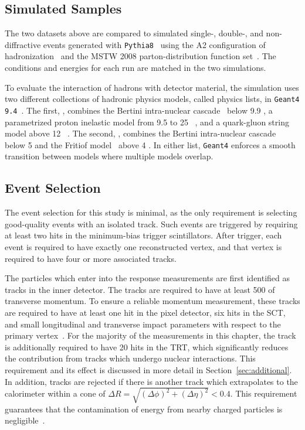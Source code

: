 \subsection{Simulated Samples}
The two datasets above are compared to simulated single-, double-, and non-diffractive events generated with \texttt{Pythia8}~\cite{PYTHIA8} using the A2 configuration of hadronization~\cite{AU2} and the MSTW 2008 parton-distribution function set~\cite{MSTW,MSTW2}.
The conditions and energies for each run are matched in the two simulations.

To evaluate the interaction of hadrons with detector material, the simulation uses two different collections of hadronic physics models, called physics lists, in \texttt{Geant4 9.4}~\cite{G4hadronics}.
The first, \QGSP, combines the Bertini intra-nuclear cascade~\cite{BERT21,BERT22,BERT23} below 9.9 \GeV, a parametrized proton inelastic model from 9.5 to 25 \GeV~\cite{GHEISHA20}, and a quark-gluon string model above 12 \GeV~\cite{QGS15,QGS16,QGS17,QGS18,QGS19}. 
The second, \FTFP, combines the Bertini intra-nuclear cascade~\cite{BERT21,BERT22,BERT23} below 5 \GeV and the Fritiof model~\cite{FTF24,FTF25,FTF26,FTF27} above 4 \GeV.
In either list, \texttt{Geant4} enforces a smooth transition between models where multiple models overlap.

\subsection{Event Selection}
\label{sec:inclusive_selection}
The event selection for this study is minimal, as the only requirement is selecting good-quality events with an isolated track. 
Such events are triggered by requiring at least two hits in the minimum-bias trigger scintillators. 
After trigger, each event is required to have exactly one reconstructed vertex, and that vertex is required to have four or more associated tracks.

The particles which enter into the response measurements are first identified as tracks in the inner detector.
The tracks are required to have at least 500 \MeV of transverse momentum.
To ensure a reliable momentum measurement, these tracks are required to have at least one hit in the pixel detector, six hits in the SCT, and small longitudinal and transverse impact parameters with respect to the primary vertex~\cite{PERF-2011-05}.
For the majority of the measurements in this chapter, the track is additionally required to have 20 hits in the TRT, which significantly reduces the contribution from tracks which undergo nuclear interactions.
This requirement and its effect is discussed in more detail in Section~\ref{sec:additional}. 
In addition, tracks are rejected if there is another track which extrapolates to the calorimeter within a cone of $\Delta R = \sqrt{(\Delta\phi)^2 + (\Delta\eta)^2} < 0.4$.
This requirement guarantees that the contamination of energy from nearby charged particles is negligible~\cite{PERF-2011-05}.

